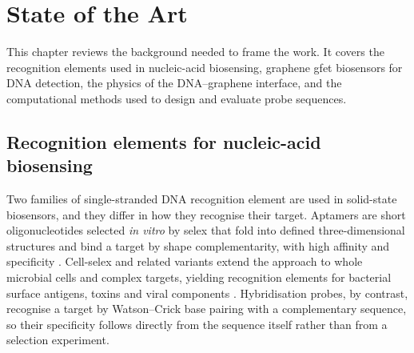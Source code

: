 \chapter{State of the Art}

This chapter reviews the background needed to frame the work. It covers the recognition elements used
in nucleic-acid biosensing, graphene \acrshort{gfet} biosensors for DNA detection, the physics
of the DNA--graphene interface, and the computational methods used to design and evaluate probe
sequences.

\section{Recognition elements for nucleic-acid biosensing}

Two families of single-stranded DNA recognition element are used in solid-state biosensors,
and they differ in how they recognise their target. Aptamers are short oligonucleotides selected
\emph{in vitro} by \acrfull{selex} \citep{tuerk1990,ellington1990} that fold into defined
three-dimensional structures and bind a target by shape complementarity, with high affinity and
specificity \citep{stephens2025,sun2022}. Cell-\acrshort{selex} and related variants extend the approach
to whole microbial cells and complex targets, yielding recognition elements for bacterial surface
antigens, toxins and viral components \citep{kolm2020,hu2024}. Hybridisation probes, by contrast,
recognise a target by Watson--Crick base pairing with a complementary sequence, so their specificity
follows directly from the sequence itself rather than from a selection experiment.

